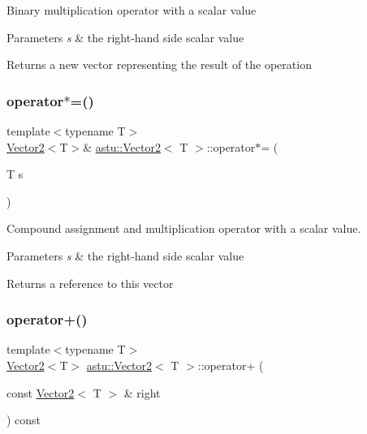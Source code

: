 Binary multiplication operator with a scalar value


\begin{DoxyParams}{Parameters}
{\em s} & the right-\/hand side scalar value \\
\hline
\end{DoxyParams}
\begin{DoxyReturn}{Returns}
a new vector representing the result of the operation 
\end{DoxyReturn}
\mbox{\label{classastu_1_1Vector2_a3a4e11dd85fbd0e1cda4e8b38b9aea6a}} 
\subsubsection{\texorpdfstring{operator$\ast$=()}{operator*=()}}
{\footnotesize\ttfamily template$<$typename T$>$ \\
\hyperlink{classastu_1_1Vector2}{Vector2}$<$T$>$\& \hyperlink{classastu_1_1Vector2}{astu\+::\+Vector2}$<$ T $>$\+::operator$\ast$= (\begin{DoxyParamCaption}\item[{T}]{s }\end{DoxyParamCaption})\hspace{0.3cm}{\ttfamily [inline]}}

Compound assignment and multiplication operator with a scalar value.


\begin{DoxyParams}{Parameters}
{\em s} & the right-\/hand side scalar value \\
\hline
\end{DoxyParams}
\begin{DoxyReturn}{Returns}
a reference to this vector 
\end{DoxyReturn}
\mbox{\label{classastu_1_1Vector2_a1ebf3c3f9ef6c8e07f6ea2327a630fca}} 
\subsubsection{\texorpdfstring{operator+()}{operator+()}}
{\footnotesize\ttfamily template$<$typename T$>$ \\
\hyperlink{classastu_1_1Vector2}{Vector2}$<$T$>$ \hyperlink{classastu_1_1Vector2}{astu\+::\+Vector2}$<$ T $>$\+::operator+ (\begin{DoxyParamCaption}\item[{const \hyperlink{classastu_1_1Vector2}{Vector2}$<$ T $>$ \&}]{right }\end{DoxyParamCaption}) const\hspace{0.3cm}{\ttfamily [inline]}}

